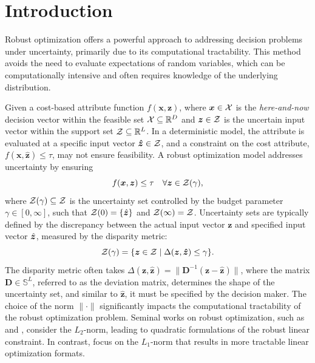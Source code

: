 \documentclass[mnsc, nonblindrev]{informswp}
\newcommand{\1}[1]{\mathds{1}{\left(#1\right)}}
\begin{document}

\maketitle

\section{Introduction}

Robust optimization offers a powerful approach to addressing decision problems under uncertainty, primarily due to its computational tractability. This method avoids the need to evaluate expectations of random variables, which can be computationally intensive and often requires knowledge of the underlying distribution.

Given a cost-based attribute function \( f(\bm x, \bm z) \), where \( \bm x \in \mathcal{X} \) is the \emph{here-and-now} decision vector within the feasible set \( \mathcal{X} \subseteq \mathbb{R}^D \) and \( \bm z \in \mathcal{Z} \) is the uncertain input vector within the support set \( \mathcal{Z} \subseteq \mathbb{R}^L \). In a deterministic model, the attribute is evaluated at a specific input vector \( \bm{\hat{z}} \in \mathcal{Z} \), and a constraint on the cost attribute, \( f(\bm x, \bm{\hat{z}}) \leq \tau \), may not ensure feasibility. A robust optimization model addresses uncertainty by ensuring
\[ 
f(\bm x, \bm z) \leq \tau \quad \forall \bm z \in \mathcal{Z}(\gamma), 
\]
where \( \mathcal{Z}(\gamma) \subseteq \mathcal{Z} \) is the uncertainty set controlled by the budget parameter \( \gamma \in [0, \infty] \), such that \( \mathcal{Z}(0) = \{\hat{\bm{z}}\} \) and \( \mathcal{Z}(\infty) = \mathcal{Z} \). Uncertainty sets are typically defined by the discrepancy between the actual input vector $\bm z$ and specified input vector $\hat{\bm{z}}$, measured by the disparity metric:
$$
\mathcal{Z}(\gamma) = \{ \bm z \in \mathcal{Z} \;|\; \Delta(\bm z, \bm{\hat{z}}) \leq \gamma \}.
$$
The disparity metric often takes $\Delta(\bm z, \bm{\hat{z}}) = \|\mathbf{D}^{-1}(\bm z - \bm{\hat{z}})\|$, where the matrix \( \mathbf{D} \in \mathbb{S}^L \), referred to as the deviation matrix, determines the shape of the uncertainty set, and similar to \( \bm{\hat{z}} \), it must be specified by the decision maker. The choice of the norm \( \|\cdot\| \) significantly impacts the computational tractability of the robust optimization problem. Seminal works on robust optimization, such as \cite{ben1998robust} and \cite{el1998robust}, consider the \( L_2 \)-norm, leading to quadratic formulations of the robust linear constraint. In contrast, \cite{bertsimas2004price} focus on the \( L_1 \)-norm that results in more tractable linear optimization formats.
\end{document}
